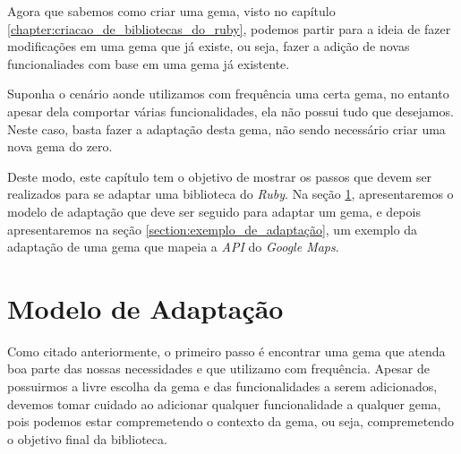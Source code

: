 Agora que sabemos como criar uma gema, visto no capítulo \ref{chapter:criacao_de_bibliotecas_do_ruby},
podemos partir para a ideia de fazer modificações em uma gema que já existe, ou seja, fazer a adição
de novas funcionaliades com base em uma gema já existente.

Suponha o cenário aonde utilizamos com frequência uma certa gema, no entanto apesar dela comportar várias 
funcionalidades, ela não possui tudo que desejamos. Neste caso, basta fazer a adaptação desta gema, não 
sendo necessário criar uma nova gema do zero.

Deste modo, este capítulo tem o objetivo de mostrar os passos que devem ser realizados para se adaptar uma
biblioteca do \emph{Ruby}. Na seção \ref{section:modelo_de_adaptação}, apresentaremos o modelo de adaptação
que deve ser seguido para adaptar um gema, e depois apresentaremos na seção \ref{section:exemplo_de_adaptação},
um exemplo da adaptação de uma gema que mapeia a \emph{API} do \emph{Google Maps}.

\section{Modelo de Adaptação}
\label{section:modelo_de_adaptação}


Como citado anteriormente, o primeiro passo é encontrar uma gema que atenda boa parte das nossas
necessidades e que utilizamo com frequência. Apesar de possuirmos a livre escolha da gema e das
funcionalidades a serem adicionados, devemos tomar cuidado ao adicionar
qualquer funcionalidade a qualquer gema, pois podemos estar compremetendo o contexto da gema, ou seja, compremetendo
o objetivo final da biblioteca.

